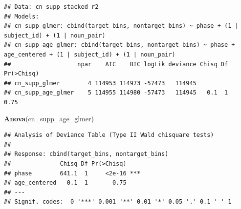 \documentclass[
  doc,floatsintext]{apa6}
\newenvironment{Shaded}{\begin{snugshade}}{\end{snugshade}}
\newcommand{\FunctionTok}[1]{\textcolor[rgb]{0.13,0.29,0.53}{\textbf{#1}}}
\newcommand{\NormalTok}[1]{#1}
\begin{document}
\begin{verbatim}
## Data: cn_supp_stacked_r2
## Models:
## cn_supp_glmer: cbind(target_bins, nontarget_bins) ~ phase + (1 | subject_id) + (1 | noun_pair)
## cn_supp_age_glmer: cbind(target_bins, nontarget_bins) ~ phase + age_centered + (1 | subject_id) + (1 | noun_pair)
##                   npar    AIC    BIC logLik deviance Chisq Df Pr(>Chisq)
## cn_supp_glmer        4 114953 114973 -57473   114945                    
## cn_supp_age_glmer    5 114955 114980 -57473   114945   0.1  1       0.75
\end{verbatim}

\begin{Shaded}
\begin{Highlighting}[]
\FunctionTok{Anova}\NormalTok{(cn\_supp\_age\_glmer)}
\end{Highlighting}
\end{Shaded}

\begin{verbatim}
## Analysis of Deviance Table (Type II Wald chisquare tests)
## 
## Response: cbind(target_bins, nontarget_bins)
##              Chisq Df Pr(>Chisq)    
## phase        641.1  1     <2e-16 ***
## age_centered   0.1  1       0.75    
## ---
## Signif. codes:  0 '***' 0.001 '**' 0.01 '*' 0.05 '.' 0.1 ' ' 1
\end{verbatim}
\end{document}
